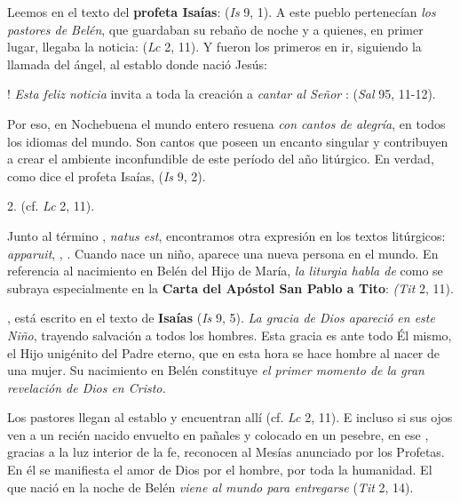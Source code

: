 \begin{body}
\begin{body}
		Leemos en el texto del \textbf{profeta Isaías}:  (\emph{Is} 9, 1). A este pueblo pertenecían \emph{los pastores de Belén}, que guardaban su rebaño de noche y a quienes, en primer lugar, llegaba la noticia:  (\emph{Lc} 2, 11). Y fueron los primeros en ir, siguiendo la llamada del ángel, al establo donde nació Jesús:

		! \emph{Esta feliz noticia} invita a toda la creación a \emph{cantar al Señor} :  (\emph{Sal} 95, 11-12).

		Por eso, en Nochebuena el mundo entero resuena \emph{con cantos de alegría}, en todos los idiomas del mundo. Son cantos que poseen un encanto singular y contribuyen a crear el ambiente inconfundible de este período del año litúrgico. En verdad, como dice el profeta Isaías,  (\emph{Is} 9, 2).

		2.  (cf. \emph{Lc} 2, 11).

		Junto al término , \emph{natus est}, encontramos otra expresión en los textos litúrgicos: \emph{apparuit}, , . Cuando nace un niño, aparece una nueva persona en el mundo. En referencia al nacimiento en Belén del Hijo de María, \emph{la liturgia habla de}  como se subraya especialmente en la \textbf{Carta del Apóstol San Pablo a Tito}:  \emph{(Tit} 2, 11).

		, está escrito en el texto de \textbf{Isaías} (\emph{Is} 9, 5). \emph{La gracia de Dios apareció en este Niño}, trayendo salvación a todos los hombres. Esta gracia es ante todo Él mismo, el Hijo unigénito del Padre eterno, que en esta hora se hace hombre al nacer de una mujer. Su nacimiento en Belén constituye \emph{el primer momento de la gran revelación de Dios en Cristo.}

		Los pastores llegan al establo y encuentran allí  (cf. \emph{Lc} 2, 11). E incluso si sus ojos ven a un recién nacido envuelto en pañales y colocado en un pesebre, en ese , gracias a la luz interior de la fe, reconocen al Mesías anunciado por los Profetas. En él se manifiesta el amor de Dios por el hombre, por toda la humanidad. El que nació en la noche de Belén \emph{viene al mundo para entregarse}  (\emph{Tit} 2, 14).


\end{body}
\end{body}
